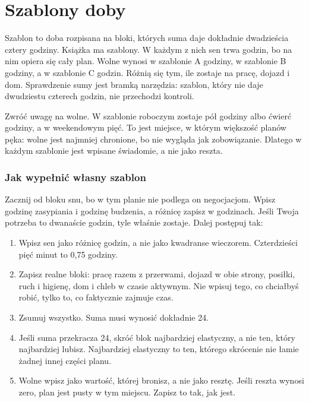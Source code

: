 \chapter{Szablony doby}

Szablon to doba rozpisana na bloki, których suma daje dokładnie dwadzieścia cztery godziny. Książka ma  szablony. W każdym z nich sen trwa  godzin, bo na nim opiera się cały plan. Wolne wynosi w szablonie A  godziny, w szablonie B  godziny, a w szablonie C  godzin. Różnią się tym, ile zostaje na pracę, dojazd i dom. Sprawdzenie sumy jest bramką narzędzia: szablon, który nie daje dwudziestu czterech godzin, nie przechodzi kontroli.


Zwróć uwagę na wolne. W szablonie roboczym zostaje pół godziny albo ćwierć godziny, a w weekendowym pięć. To jest miejsce, w którym większość planów pęka: wolne jest najmniej chronione, bo nie wygląda jak zobowiązanie. Dlatego w każdym szablonie jest wpisane świadomie, a nie jako reszta.

\subsection*{Jak wypełnić własny szablon}

Zacznij od bloku snu, bo w tym planie nie podlega on negocjacjom. Wpisz godzinę zasypiania i godzinę budzenia, a różnicę zapisz w godzinach. Jeśli Twoja potrzeba to dwanaście godzin, tyle właśnie zostaje. Dalej postępuj tak:

\begin{enumerate}
\item Wpisz sen jako różnicę godzin, a nie jako kwadranse wieczorem. Czterdzieści pięć minut to 0,75 godziny.
\item Zapisz realne bloki: pracę razem z przerwami, dojazd w obie strony, posiłki, ruch i higienę, dom i chleb w czasie aktywnym. Nie wpisuj tego, co chciałbyś robić, tylko to, co faktycznie zajmuje czas.
\item Zsumuj wszystko. Suma musi wynosić dokładnie 24.
\item Jeśli suma przekracza 24, skróć blok najbardziej elastyczny, a nie ten, który najbardziej lubisz. Najbardziej elastyczny to ten, którego skrócenie nie łamie żadnej innej części planu.
\item Wolne wpisz jako wartość, której bronisz, a nie jako resztę. Jeśli reszta wynosi zero, plan jest pusty w tym miejscu. Zapisz to tak, jak jest.
\end{enumerate}

